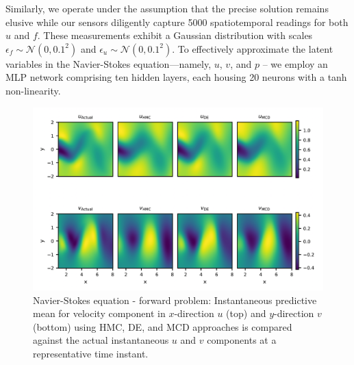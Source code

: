 \documentclass{article}
\begin{document}
Similarly, we operate under the assumption that the precise solution remains elusive while our sensors diligently capture 5000 spatiotemporal readings for both $u$ and $f$.
These measurements exhibit a Gaussian distribution with scales $\epsilon_f \sim \mathcal{N}(0, 0.1^2)$ and $\epsilon_u \sim \mathcal{N}(0, 0.1^2)$. 
To effectively approximate the latent variables in the Navier-Stokes equation—namely, $u$, $v$, and $p$ -- we employ an MLP network comprising ten hidden layers, each housing 20 neurons with a tanh non-linearity.

%
\begin{figure}
\includegraphics[width=\linewidth]{images/NSforward.png}
\caption{Navier-Stokes equation - forward problem: Instantaneous predictive mean for velocity component in $x$-direction $u$ (top) and $y$-direction $v$ (bottom) using HMC, DE, and MCD approaches is compared against the actual instantaneous $u$ and $v$ components at a representative time instant.}
\label{fig:navier-stokes-mean}
\end{figure}
%
\end{document}
